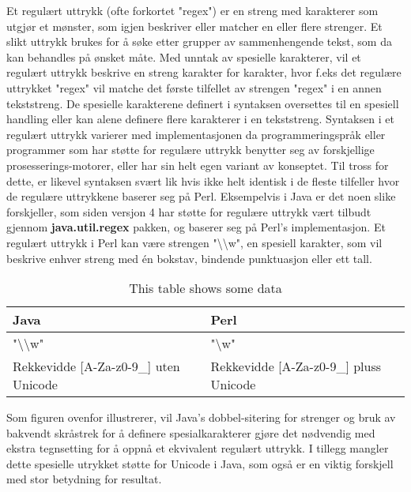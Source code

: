 \documentclass[../main.tex]{subfiles}
\begin{document}
Et regulært uttrykk (ofte forkortet "regex") er en streng med karakterer som utgjør et mønster, som igjen beskriver eller matcher en eller flere strenger.  Et slikt uttrykk brukes for å søke etter grupper av sammenhengende tekst, som da kan behandles på ønsket måte. Med unntak av spesielle karakterer, vil et regulært uttrykk beskrive en streng karakter for karakter, hvor f.eks det regulære uttrykket "regex" vil matche det første tilfellet av strengen "regex" i en annen tekststreng. De spesielle karakterene definert i syntaksen oversettes til en spesiell handling eller kan alene definere flere karakterer i en tekststreng. \newline
Syntaksen i et regulært uttrykk varierer med implementasjonen da programmeringspråk eller programmer som har støtte for regulære uttrykk benytter seg av forskjellige prosesserings-motorer, eller har sin helt egen variant av konseptet. Til tross for dette, er likevel syntaksen svært lik hvis ikke helt identisk i de fleste tilfeller hvor de regulære uttrykkene baserer seg på Perl. Eksempelvis i Java er det noen slike forskjeller, som siden versjon 4 har støtte for regulære uttrykk vært tilbudt gjennom \textbf{java.util.regex} pakken, og baserer seg på Perl’s implementasjon. Et regulært uttrykk i Perl kan være strengen "\textbackslash \textbackslash w", en spesiell karakter, som vil beskrive enhver streng med én bokstav, bindende punktuasjon eller ett tall.

\begin{table}[H]
\begin{center}
\caption{This table shows some data}
  \begin{tabular}{ | p{6cm} | p{6cm} |}
    \hline
    Java & Perl \\ \hline
    "\textbackslash \textbackslash w" & "\textbackslash w" \\ \hline
    Rekkevidde [A-Za-z0-9\_] uten Unicode & Rekkevidde [A-Za-z0-9\_] pluss Unicode \\
    \hline
  \end{tabular}
\end{center}
\end{table}
Som figuren ovenfor illustrerer, vil Java’s dobbel-sitering for strenger og bruk av bakvendt skråstrek for å definere spesialkarakterer gjøre det nødvendig med ekstra tegnsetting for å oppnå et ekvivalent regulært uttrykk. I tillegg mangler dette spesielle utrykket støtte for Unicode i Java, som også er en viktig forskjell med stor betydning for resultat.
\end{document}
